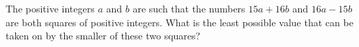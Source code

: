 The positive integers $a$ and $b$ are such that the numbers $15a+16b$ and $16a-15b$ are both squares of positive integers. What is the least possible value that can be taken on by the smaller of these two squares?
